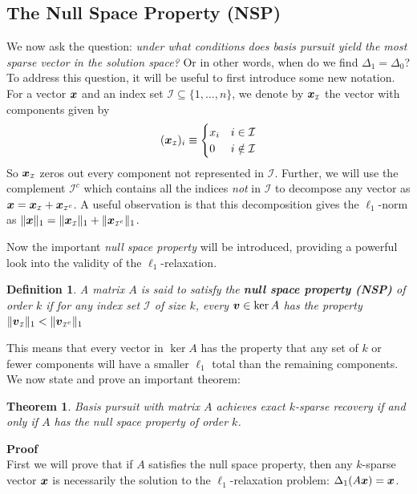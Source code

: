 \documentclass[twocolumn]{gwclass}
\newtheorem{theorem}{Theorem}[section]
\newtheorem{definition}{Definition}
\begin{document}
	\subsection{The Null Space Property (NSP)}
	We now ask the question: \emph{under what conditions does basis pursuit yield the most sparse vector in the solution space?} Or in other words, when do we find $\Delta_1=\Delta_0$? To address this question, it will be useful to first introduce some new notation. For a vector $\boldsymbol{x}$ and an index set $\mathcal{I}\subseteq\{1,\dots,n\}$, we denote by $\boldsymbol{x}_{\scriptscriptstyle\mathcal{I}}$ the vector with components given by
	$$ (\boldsymbol{x}_{\scriptscriptstyle\mathcal{I}})_i \equiv \begin{cases}
		x_i & i\in\mathcal{I}\\
		0 & i\notin\mathcal{I}
	\end{cases} $$
	So $\boldsymbol{x}_{\scriptscriptstyle\mathcal{I}}$ zeros out every component not represented in $\mathcal{I}$. Further, we will use the complement $\mathcal{I}^c$ which contains all the indices \emph{not} in $\mathcal{I}$ to decompose any vector as $\boldsymbol{x}=\boldsymbol{x}_{\scriptscriptstyle\mathcal{I}} + \boldsymbol{x}_{\scriptscriptstyle\mathcal{I}^c}$. A useful observation is that this decomposition gives the $\ell_1$-norm as $\|\boldsymbol{x}\|_1 = \|\boldsymbol{x}_{\scriptscriptstyle\mathcal{I}}\|_1 + \|\boldsymbol{x}_{\scriptscriptstyle\mathcal{I}^c}\|_1$.
	
	Now the important \emph{null space property} will be introduced, providing a powerful look into the validity of the $\ell_1$-relaxation.

	\begin{definition}
		A matrix $A$ is said to satisfy the \textbf{null space property (NSP)} of order $k$ if for any index set $\mathcal{I}$ of size $k$, every  $\boldsymbol{v}\in\ker A$ has the property $\|\boldsymbol{v}_{\scriptscriptstyle\mathcal{I}}\|_1 < \|\boldsymbol{v}_{\scriptscriptstyle\mathcal{I}^c}\|_1$
	\end{definition}

	This means that every vector in $\ker A$ has the property that any set of $k$ or fewer components will have a smaller $\ell_1$ total than the remaining components. We now state and prove an important theorem: 
	
	\begin{theorem}
		Basis pursuit with matrix $A$ achieves exact $k$-sparse recovery if and only if $A$ has the null space property of order $k$.
	\end{theorem}
	\noindent\textbf{Proof}\\
	First we will prove that if $A$ satisfies the null space property, then any $k$-sparse vector $\boldsymbol{x}$ is necessarily the solution to the $\ell_1$-relaxation problem: $\Delta_1(A\boldsymbol{x})=\boldsymbol{x}$. 
	
\end{document}
